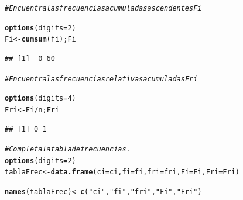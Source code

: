 \documentclass[12pt,letterpaper]{article}\usepackage[]{graphicx}\usepackage[]{color}
\makeatletter
\newcommand{\hlnum}[1]{\textcolor[rgb]{0.686,0.059,0.569}{#1}}%
\newcommand{\hlstr}[1]{\textcolor[rgb]{0.192,0.494,0.8}{#1}}%
\newcommand{\hlcom}[1]{\textcolor[rgb]{0.678,0.584,0.686}{\textit{#1}}}%
\newcommand{\hlopt}[1]{\textcolor[rgb]{0,0,0}{#1}}%
\newcommand{\hlstd}[1]{\textcolor[rgb]{0.345,0.345,0.345}{#1}}%
\newcommand{\hlkwb}[1]{\textcolor[rgb]{0.69,0.353,0.396}{#1}}%
\newcommand{\hlkwc}[1]{\textcolor[rgb]{0.333,0.667,0.333}{#1}}%
\newcommand{\hlkwd}[1]{\textcolor[rgb]{0.737,0.353,0.396}{\textbf{#1}}}%
\newenvironment{kframe}{%
 \def\at@end@of@kframe{}%
 \ifinner\ifhmode%
  \def\at@end@of@kframe{\end{minipage}}%
  \begin{minipage}{\columnwidth}%
 \fi\fi%
 \def\FrameCommand##1{\hskip\@totalleftmargin \hskip-\fboxsep
 \colorbox{shadecolor}{##1}\hskip-\fboxsep
     \hskip-\linewidth \hskip-\@totalleftmargin \hskip\columnwidth}%
 \MakeFramed {\advance\hsize-\width
   \@totalleftmargin\z@ \linewidth\hsize
   \@setminipage}}%
 {\par\unskip\endMakeFramed%
 \at@end@of@kframe}
\newenvironment{knitrout}{}{} %
\makeatother
\begin{document}
\begin{enumerate}
\begin{knitrout}
\color{fgcolor}\begin{kframe}
\begin{alltt}
\hlcom{# Encuentra las frecuencias acumuladas ascendentes Fi}

\hlkwd{options}\hlstd{(}\hlkwc{digits}\hlstd{=}\hlnum{2}\hlstd{)}
\hlstd{Fi} \hlkwb{<-} \hlkwd{cumsum}\hlstd{(fi); Fi}
\end{alltt}
\begin{verbatim}
## [1]  0 60
\end{verbatim}
\end{kframe}
\end{knitrout}

\begin{knitrout}
\color{fgcolor}\begin{kframe}
\begin{alltt}
\hlcom{# Encuentra las frecuencias relativas acumuladas Fri}

\hlkwd{options}\hlstd{(}\hlkwc{digits}\hlstd{=}\hlnum{4}\hlstd{)}
\hlstd{Fri} \hlkwb{<-} \hlstd{Fi}\hlopt{/}\hlstd{n; Fri}
\end{alltt}
\begin{verbatim}
## [1] 0 1
\end{verbatim}
\end{kframe}
\end{knitrout}

\begin{knitrout}
\color{fgcolor}\begin{kframe}
\begin{alltt}
\hlcom{# Completa la tabla de frecuencias.}
\hlkwd{options}\hlstd{(}\hlkwc{digits}\hlstd{=}\hlnum{2}\hlstd{)}
\hlstd{tablaFrec} \hlkwb{<-} \hlkwd{data.frame}\hlstd{(}\hlkwc{ci}\hlstd{=ci,} \hlkwc{fi}\hlstd{=fi,} \hlkwc{fri}\hlstd{=fri,} \hlkwc{Fi}\hlstd{=Fi,} \hlkwc{Fri}\hlstd{=Fri)}
\end{alltt}


{\ttfamily\noindent\bfseries\color{errorcolor}{\#\# Error in data.frame(ci = ci, fi = fi, fri = fri, Fi = Fi, Fri = Fri): arguments imply differing number of rows: 7, 2}}\begin{alltt}
\hlkwd{names}\hlstd{(tablaFrec)} \hlkwb{<-} \hlkwd{c}\hlstd{(}\hlstr{"ci"}\hlstd{,} \hlstr{"fi"}\hlstd{,} \hlstr{"fri"}\hlstd{,} \hlstr{"Fi"}\hlstd{,} \hlstr{"Fri"}\hlstd{)}
\end{alltt}



\end{kframe}
\end{knitrout}
\end{enumerate}
\end{document}
